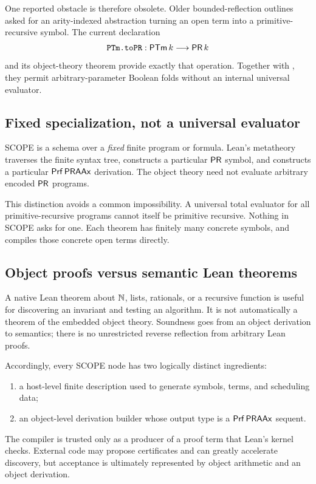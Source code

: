 One reported obstacle is therefore obsolete.  Older bounded-reflection outlines asked for an arity-indexed abstraction turning an open term into a primitive-recursive symbol.  The current declaration
\[
  \code{PTm.toPR} : \PTm\,k \longrightarrow \PR\,k
\]
and its object-theory theorem  provide exactly that operation.  Together with , they permit arbitrary-parameter Boolean folds without an internal universal evaluator.

\subsection{Fixed specialization, not a universal evaluator}

SCOPE is a schema over a \emph{fixed} finite program or formula.  Lean's metatheory traverses the finite syntax tree, constructs a particular \(\mathsf{PR}\) symbol, and constructs a particular \(\mathsf{Prf}\,\mathsf{PRAAx}\) derivation.  The object theory need not evaluate arbitrary encoded \(\mathsf{PR}\) programs.

This distinction avoids a common impossibility.  A universal total evaluator for all primitive-recursive programs cannot itself be primitive recursive.  Nothing in SCOPE asks for one.  Each theorem has finitely many concrete symbols, and  compiles those concrete open terms directly.

\subsection{Object proofs versus semantic Lean theorems}

A native Lean theorem about \(\mathbb N\), lists, rationals, or a recursive function is useful for discovering an invariant and testing an algorithm.  It is not automatically a theorem of the embedded object theory.  Soundness goes from an object derivation to semantics; there is no unrestricted reverse reflection from arbitrary Lean proofs.

Accordingly, every SCOPE node has two logically distinct ingredients:

\begin{enumerate}
\item a host-level finite description used to generate symbols, terms, and scheduling data;
\item an object-level derivation builder whose output type is a \(\mathsf{Prf}\,\mathsf{PRAAx}\) sequent.
\end{enumerate}

The compiler is trusted only as a producer of a proof term that Lean's kernel checks.  External code may propose certificates and can greatly accelerate discovery, but acceptance is ultimately represented by object arithmetic and an object derivation.

